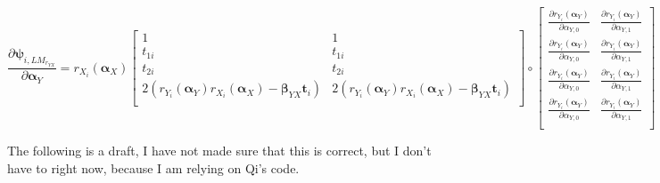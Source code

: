 \documentclass[]{article}
\begin{document}
{{\[
\frac{\partial \pmb{\psi}_{i,LM_{r_{YX}}}}{\partial \pmb{\alpha}_Y} =  r_{X_i}(\pmb{\alpha}_X)
	\begin{bmatrix}
		1 & 1\\
		t_{1i} & t_{1i} \\
		t_{2i} & t_{2i} \\
		2(r_{Y_i}(\pmb{\alpha}_Y)r_{X_i}(\pmb{\alpha}_X) - \pmb{\beta}_{YX}\pmb{t}_i) & 2(r_{Y_i}(\pmb{\alpha}_Y)r_{X_i}(\pmb{\alpha}_X) - \pmb{\beta}_{YX}\pmb{t}_i)\\
 	\end{bmatrix} 
  \circ
	\begin{bmatrix}
		\frac{\partial r_{Y_i}(\pmb{\alpha}_Y)}{\partial \alpha_{Y,0}} & \frac{\partial r_{Y_i}(\pmb{\alpha}_Y)}{\partial \alpha_{Y,1}}\\
		\frac{\partial r_{Y_i}(\pmb{\alpha}_Y)}{\partial \alpha_{Y,0}} & \frac{\partial r_{Y_i}(\pmb{\alpha}_Y)}{\partial \alpha_{Y,1}}\\
		\frac{\partial r_{Y_i}(\pmb{\alpha}_Y)}{\partial \alpha_{Y,0}} & \frac{\partial r_{Y_i}(\pmb{\alpha}_Y)}{\partial \alpha_{Y,1}}\\
		\frac{\partial r_{Y_i}(\pmb{\alpha}_Y)}{\partial \alpha_{Y,0}} & \frac{\partial r_{Y_i}(\pmb{\alpha}_Y)}{\partial \alpha_{Y,1}}\\
 	\end{bmatrix} 
\]
}}


The following is a draft, I have not made sure that this is correct, but I don't have to right now, because I am relying on Qi's code.
\end{document}
